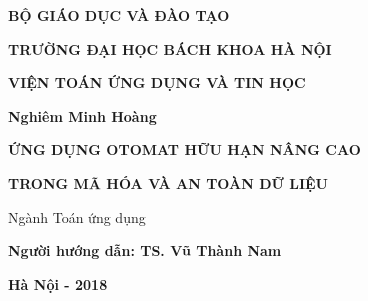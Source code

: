 
\begin{titlepage}
\centerline{\bf BỘ GIÁO DỤC VÀ ĐÀO TẠO}
\centerline{\bf TRƯỜNG ĐẠI HỌC BÁCH KHOA HÀ NỘI}
\centerline{\bf VIỆN TOÁN ỨNG DỤNG VÀ TIN HỌC}
\vspace*{2cm}
\centerline{\bf Nghiêm Minh Hoàng}
\vspace*{3cm}
\centerline{\Large\bf ỨNG DỤNG OTOMAT HỮU HẠN NÂNG CAO}
\vspace*{0.5cm}
\centerline{\Large\bf TRONG MÃ HÓA VÀ AN TOÀN DỮ LIỆU}
\vspace*{3cm}
\centerline{Ngành Toán ứng dụng}

\vspace*{2cm}
\centerline{\bf Người hướng dẫn: TS. Vũ Thành Nam}

\vfill
\centerline{\bf Hà Nội - 2018}
\end{titlepage}
\newpage
\vspace*{5cm}

\thispagestyle{empty}